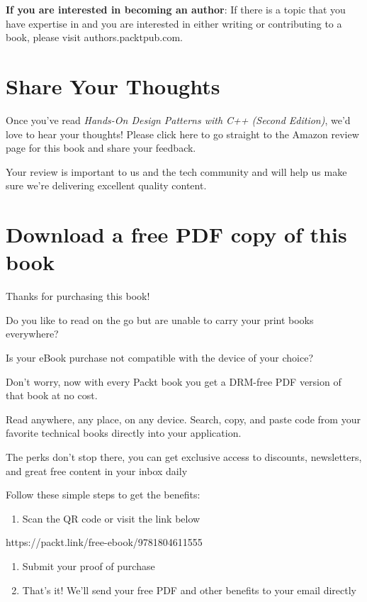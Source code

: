 \textbf{If you are interested in becoming an author}: If there is a topic that you have expertise in and you are interested in either writing or contributing to a book, please visit authors.packtpub.com.

\section{Share Your Thoughts}

Once you've read \emph{Hands-On Design Patterns with C++ (Second Edition)}, we'd love to hear your thoughts! Please click here to go straight to the Amazon review page for this book and share your feedback.

Your review is important to us and the tech community and will help us make sure we're delivering excellent quality content.

\section{Download a free PDF copy of this book}

Thanks for purchasing this book!

Do you like to read on the go but are unable to carry your print books everywhere?

Is your eBook purchase not compatible with the device of your choice?

Don't worry, now with every Packt book you get a DRM-free PDF version of that book at no cost.

Read anywhere, any place, on any device. Search, copy, and paste code from your favorite technical books directly into your application.

The perks don't stop there, you can get exclusive access to discounts, newsletters, and great free content in your inbox daily

Follow these simple steps to get the benefits:

\begin{enumerate}
\tightlist
\item
  Scan the QR code or visit the link below
\end{enumerate}


https://packt.link/free-ebook/9781804611555

\begin{enumerate}
\tightlist
\item
  Submit your proof of purchase
\item
  That's it! We'll send your free PDF and other benefits to your email directly
\end{enumerate}

\protect{}\label{B19262_Part_01.xhtml}{}